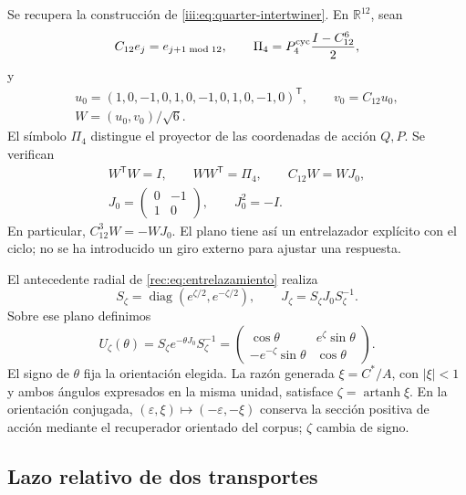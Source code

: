 Se recupera la construcción de \eqref{iii:eq:quarter-intertwiner}. En \(\mathbb R^{12}\),
sean
\[
 C_{12}e_j=e_{j+1\bmod12},\qquad
 \Pi_4=P_4^{\rm cyc}\frac{I-C_{12}^6}{2},
\]
y
\begin{equation}
 \begin{gathered}
 u_0=(1,0,-1,0,1,0,-1,0,1,0,-1,0)^{\mathsf T},\qquad
 v_0=C_{12}u_0,\\
 W=(u_0,v_0)/\sqrt6.
 \end{gathered}
 \label{md:comp:isometria-ciclica}
\end{equation}
El símbolo \(\Pi_4\) distingue el proyector de las coordenadas de
acción \(Q,P\). Se verifican
\begin{equation}
 \begin{gathered}
 W^{\mathsf T}W=I,\qquad WW^{\mathsf T}=\Pi_4,\qquad
 C_{12}W=WJ_0,\\
 J_0=\begin{pmatrix}0&-1\\1&0\end{pmatrix},\qquad J_0^2=-I.
 \end{gathered}
 \label{md:comp:entrelazador-ciclico}
\end{equation}
En particular, \(C_{12}^3W=-WJ_0\). El plano tiene así un entrelazador
explícito con el ciclo; no se ha introducido un giro externo para
ajustar una respuesta.

El antecedente radial de \eqref{rec:eq:entrelazamiento} realiza
\[
 S_\zeta=\operatorname{diag}(e^{\zeta/2},e^{-\zeta/2}),
 \qquad J_\zeta=S_\zeta J_0S_\zeta^{-1}.
\]
Sobre ese plano definimos
\begin{equation}
 U_\zeta(\theta)=S_\zeta e^{-\theta J_0}S_\zeta^{-1}
 =\begin{pmatrix}
 \cos\theta&e^\zeta\sin\theta\\
 -e^{-\zeta}\sin\theta&\cos\theta
 \end{pmatrix}.
 \label{md:comp:transporte-plano}
\end{equation}
El signo de \(\theta\) fija la orientación elegida. La razón generada
\(\xi=C^*/A\), con \(|\xi|<1\) y ambos ángulos expresados en la misma
unidad, satisface \(\zeta=\operatorname{artanh}\xi\).
En la orientación conjugada,
\((\varepsilon,\xi)\mapsto(-\varepsilon,-\xi)\) conserva la sección
positiva de acción mediante el recuperador orientado del corpus;
\(\zeta\) cambia de signo.

\subsection{Lazo relativo de dos transportes}
\label{md:comp:lazo}

